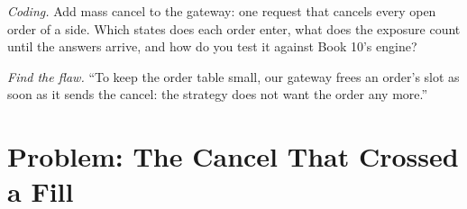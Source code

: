 \begin{exercise}[$\star\star\star$]\label{exo:ll:order-gateway-and-order-management:7}
\emph{Coding.} Add mass cancel to the gateway: one request that cancels every open order of a side. Which states does each order
enter, what does the exposure count until the answers arrive, and how do you test it against Book 10's engine?
\end{exercise}

\begin{exercise}[$\star\star\star$]\label{exo:ll:order-gateway-and-order-management:8}
\emph{Find the flaw.} ``To keep the order table small, our gateway frees an order's slot as soon as it sends the cancel: the
strategy does not want the order any more.''
\end{exercise}

\section{Problem: The Cancel That Crossed a Fill}

